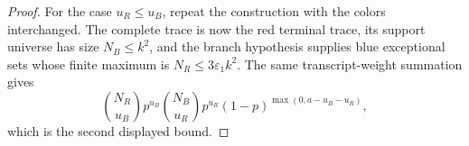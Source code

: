 \begin{proof}
For the case \(u_R\le u_B\), repeat the construction with the colors
interchanged.  The complete trace is now the red terminal trace, its support
universe has size \(N_B\le k^2\), and the branch hypothesis supplies blue
exceptional sets whose finite maximum is \(N_R\le3\varepsilon_1k^2\).  The
same transcript-weight summation gives
\[
\binom{N_R}{u_B}p^{u_B}\binom{N_B}{u_R}p^{u_R}
(1-p)^{\max(0,a-u_B-u_R)},
\]
which is the second displayed bound.
\end{proof}
